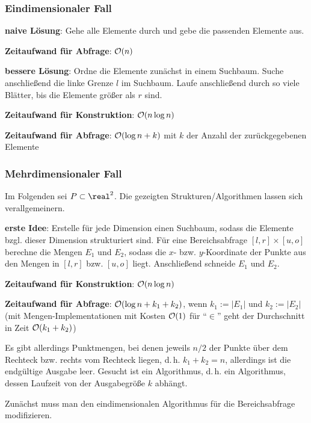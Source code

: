 \subsubsection{%
    Eindimensionaler Fall%
}

\textbf{naive Lösung}:
Gehe alle Elemente durch und gebe die passenden Elemente aus.

\textbf{Zeitaufwand für Abfrage}:
$\mathcal{O}(n)$

\linie

\textbf{bessere Lösung}:
Ordne die Elemente zunächst in einem Suchbaum.
Suche anschließend die linke Grenze $l$ im Suchbaum.
Laufe anschließend durch so viele Blätter, bis die Elemente größer als $r$ sind.

\textbf{Zeitaufwand für Konstruktion}:
$\mathcal{O}(n \log n)$

\textbf{Zeitaufwand für Abfrage}:
$\mathcal{O}(\log n + k)$ mit $k$ der Anzahl der zurückgegebenen Elemente

\subsubsection{%
    Mehrdimensionaler Fall%
}

Im Folgenden sei $P \subset \real^2$.
Die gezeigten Strukturen/Algorithmen lassen sich verallgemeinern.

\textbf{erste Idee}:
Erstelle für jede Dimension einen Suchbaum, sodass die Elemente bzgl. dieser Dimension
strukturiert sind.
Für eine Bereichsabfrage $[l, r] \times [u, o]$ berechne die Mengen $E_1$ und $E_2$,
sodass die $x$- bzw. $y$-Koordinate der Punkte aus den Mengen in $[l, r]$ bzw. $[u, o]$ liegt.
Anschließend schneide $E_1$ und $E_2$.

\textbf{Zeitaufwand für Konstruktion}:
$\mathcal{O}(n \log n)$

\textbf{Zeitaufwand für Abfrage}:
$\mathcal{O}(\log n + k_1 + k_2)$,
wenn $k_1 := |E_1|$ und $k_2 := |E_2|$
(mit Mengen-Implementationen mit Kosten $\mathcal{O}(1)$ für "`$\in$"' geht der Durchschnitt in
Zeit $\mathcal{O}(k_1 + k_2)$)

Es gibt allerdings Punktmengen, bei denen jeweils $n/2$ der Punkte über dem Rechteck bzw.
rechts vom Rechteck liegen,
d.\,h. $k_1 + k_2 = n$, allerdings ist die endgültige Ausgabe leer.
Gesucht ist ein  Algorithmus,
d.\,h. ein Algorithmus, dessen Laufzeit von der Ausgabegröße $k$ abhängt.

\linie

Zunächst muss man den eindimensionalen Algorithmus für die Bereichsabfrage modifizieren.

